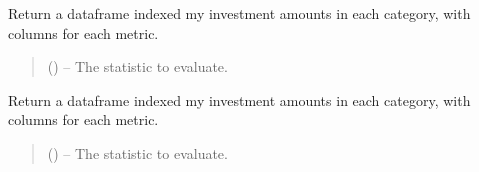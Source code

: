 \documentclass[letterpaper,10pt,english]{sphinxmanual}
\begin{document}
\begin{fulllineitems}
\begin{fulllineitems}
\begin{quote}
\begin{description}
\end{description}\end{quote}

\end{fulllineitems}


\begin{fulllineitems}
\label{\detokenize{tyche:tyche.Evaluator.Evaluator.evaluate_corners_semilong}}
\pysigstartsignatures
{}
\pysigstopsignatures
\sphinxAtStartPar
Return a dataframe indexed my investment amounts in each category,
with columns for each metric.
\begin{quote}\begin{description}
\sphinxAtStartPar
{} () – The statistic to evaluate.

\end{description}\end{quote}

\end{fulllineitems}


\begin{fulllineitems}
\label{\detokenize{tyche:tyche.Evaluator.Evaluator.evaluate_corners_wide}}
\pysigstartsignatures
{}
\pysigstopsignatures
\sphinxAtStartPar
Return a dataframe indexed my investment amounts in each category,
with columns for each metric.
\begin{quote}\begin{description}
\sphinxAtStartPar
{} () – The statistic to evaluate.

\end{description}\end{quote}

\end{fulllineitems}


\end{fulllineitems}
\end{document}

